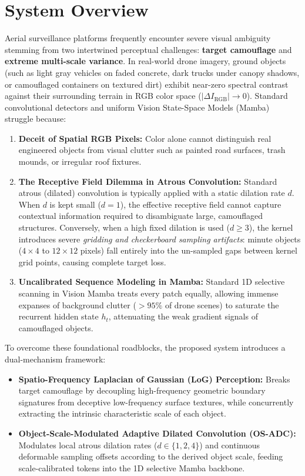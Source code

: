 \documentclass[12pt,a4paper]{report}
\begin{document}
\section{System Overview}
Aerial surveillance platforms frequently encounter severe visual ambiguity stemming from two intertwined perceptual challenges: \textbf{target camouflage} and \textbf{extreme multi-scale variance}. In real-world drone imagery, ground objects (such as light gray vehicles on faded concrete, dark trucks under canopy shadows, or camouflaged containers on textured dirt) exhibit near-zero spectral contrast against their surrounding terrain in RGB color space ($|\Delta I_{\text{RGB}}| \to 0$). Standard convolutional detectors and uniform Vision State-Space Models (Mamba)~\cite{gu2023mamba,liu2024vmamba} struggle because:
\begin{enumerate}
    \item \textbf{Deceit of Spatial RGB Pixels:} Color alone cannot distinguish real engineered objects from visual clutter such as painted road surfaces, trash mounds, or irregular roof fixtures.
    \item \textbf{The Receptive Field Dilemma in Atrous Convolution:} Standard atrous (dilated) convolution is typically applied with a static dilation rate $d$. When $d$ is kept small ($d=1$), the effective receptive field cannot capture contextual information required to disambiguate large, camouflaged structures. Conversely, when a high fixed dilation is used ($d \ge 3$), the kernel introduces severe \textit{gridding and checkerboard sampling artifacts}: minute objects ($4 \times 4$ to $12 \times 12$ pixels) fall entirely into the un-sampled gaps between kernel grid points, causing complete target loss.
    \item \textbf{Uncalibrated Sequence Modeling in Mamba:} Standard 1D selective scanning in Vision Mamba treats every patch equally, allowing immense expanses of background clutter ($>95\%$ of drone scenes) to saturate the recurrent hidden state $h_t$, attenuating the weak gradient signals of camouflaged objects.
\end{enumerate}

To overcome these foundational roadblocks, the proposed system introduces a dual-mechanism framework:
\begin{itemize}
    \item \textbf{Spatio-Frequency Laplacian of Gaussian (LoG) Perception:} Breaks target camouflage by decoupling high-frequency geometric boundary signatures from deceptive low-frequency surface textures, while concurrently extracting the intrinsic characteristic scale of each object.
    \item \textbf{Object-Scale-Modulated Adaptive Dilated Convolution (OS-ADC):} Modulates local atrous dilation rates ($d \in \{1, 2, 4\}$) and continuous deformable sampling offsets according to the derived object scale, feeding scale-calibrated tokens into the 1D selective Mamba backbone.
\end{itemize}
\end{document}

